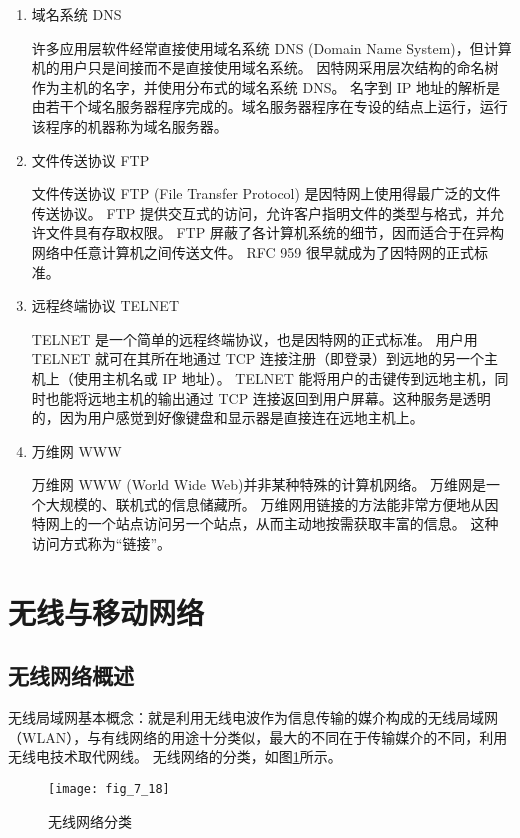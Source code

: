 \begin{enumerate}
  \item 域名系统 DNS

许多应用层软件经常直接使用域名系统 DNS (Domain Name System)，但计算机的用户只是间接而不是直接使用域名系统。
因特网采用层次结构的命名树作为主机的名字，并使用分布式的域名系统 DNS。
名字到 IP 地址的解析是由若干个域名服务器程序完成的。域名服务器程序在专设的结点上运行，运行该程序的机器称为域名服务器。

  \item 文件传送协议 FTP

  文件传送协议 FTP (File Transfer Protocol) 是因特网上使用得最广泛的文件传送协议。
FTP 提供交互式的访问，允许客户指明文件的类型与格式，并允许文件具有存取权限。
FTP 屏蔽了各计算机系统的细节，因而适合于在异构网络中任意计算机之间传送文件。
RFC 959 很早就成为了因特网的正式标准。


  \item 远程终端协议 TELNET

  TELNET 是一个简单的远程终端协议，也是因特网的正式标准。
用户用 TELNET 就可在其所在地通过 TCP 连接注册（即登录）到远地的另一个主机上（使用主机名或 IP 地址）。
TELNET 能将用户的击键传到远地主机，同时也能将远地主机的输出通过 TCP 连接返回到用户屏幕。这种服务是透明的，因为用户感觉到好像键盘和显示器是直接连在远地主机上。


  \item 万维网 WWW

  万维网 WWW (World Wide Web)并非某种特殊的计算机网络。
万维网是一个大规模的、联机式的信息储藏所。
万维网用链接的方法能非常方便地从因特网上的一个站点访问另一个站点，从而主动地按需获取丰富的信息。
这种访问方式称为“链接”。


\end{enumerate}





\section{无线与移动网络}


\subsection{无线网络概述}
无线局域网基本概念：就是利用无线电波作为信息传输的媒介构成的无线局域网（WLAN），与有线网络的用途十分类似，最大的不同在于传输媒介的不同，利用无线电技术取代网线。
无线网络的分类，如图\ref{fig_7_18}所示。

\begin{figure}
  \centering
  \texttt{[image: fig\_7\_18]}
  \caption{无线网络分类}\label{fig_7_18}
\end{figure}


